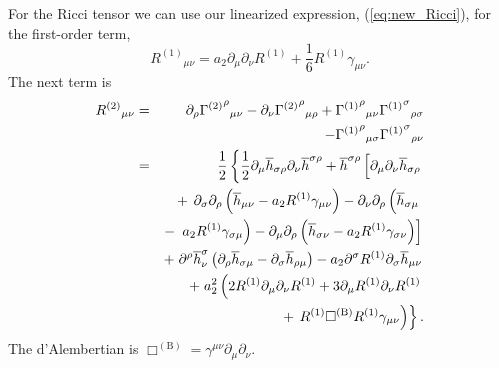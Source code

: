 \documentclass[aps,prd,amsfonts,amssymb,amsmath,nofootinbib,reprint,showpacs]{revtex4-1}
\newcommand{\eqnref}[1]{(\ref{eq:#1})}
\newcommand{\recip}[1]{\ensuremath{\frac{1}{#1}}}
\begin{document}
For the Ricci tensor we can use our linearized expression, \eqnref{new_Ricci}, for the first-order term,
\begin{equation}
{R^{(1)}}_{\mu\nu} = a_2\partial_\mu\partial_\nu R^{(1)} + \recip{6} R^{(1)}\gamma_{\mu\nu}.
\end{equation}
The next term is
\begin{eqnarray}
{R^{(2)}}_{\mu\nu} & = & \partial_\rho {{\Gamma^{(2)}}^\rho}_{\mu\nu} - \partial_\nu {{\Gamma^{(2)}}^\rho}_{\mu\rho} + {{\Gamma^{(1)}}^\rho}_{\mu\nu}{{\Gamma^{(1)}}^\sigma}_{\rho\sigma} \nonumber \\* 
 & & - {} {{\Gamma^{(1)}}^\rho}_{\mu\sigma}{{\Gamma^{(1)}}^\sigma}_{\rho\nu} \nonumber \\
 & = & \frac{1}{2}\left\{\recip{2}\partial_\mu\overline{h}_{\sigma\rho}\partial_\nu\overline{h}^{\sigma\rho} + \overline{h}^{\sigma\rho}\left[\partial_\mu\partial_\nu\overline{h}_{\sigma\rho} \vphantom{R^{(1)}} \right.\right. \nonumber \\*
 & & + \left.\left. \partial_\sigma\partial_\rho\left(\overline{h}_{\mu\nu} - a_2 R^{(1)}\gamma_{\mu\nu}\right) - \partial_\nu\partial_\rho\left(\overline{h}_{\sigma\mu} \vphantom{R^{(1)}} \right.\right.\right. \nonumber \\*
 & & - \left.\left.\left. a_2 R^{(1)} \gamma_{\sigma\mu}\right) - \partial_\mu\partial_\rho\left(\overline{h}_{\sigma\nu} - a_2 R^{(1)} \gamma_{\sigma\nu}\right)\right] \right. \nonumber \\*
 & & + \left. \partial^\rho\overline{h}^\sigma_\nu\left(\partial_\rho\overline{h}_{\sigma\mu} - \partial_\sigma\overline{h}_{\rho\mu}\right) - a_2 \partial^\sigma R^{(1)}\partial_\sigma\overline{h}_{\mu\nu} \right. \nonumber \\*
 & & + \left. a_2^2 \left(2R^{(1)}\partial_\mu\partial_\nu R^{(1)} + 3\partial_\mu R^{(1)}\partial_\nu R^{(1)} \right.\right. \nonumber \\*
 & & + \left.\left. R^{(1)} \Box^{(\text{B})} R^{(1)} \gamma_{\mu\nu}\right)\right\}.
\end{eqnarray}
The d'Alembertian is $\Box^{(\text{B})} = \gamma^{\mu\nu}\partial_\mu\partial_\nu$.
\end{document}
